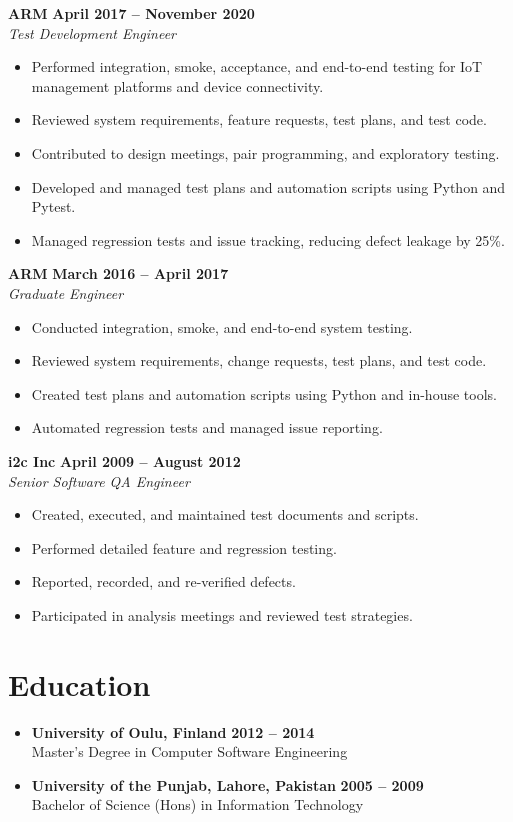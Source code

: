 \documentclass[12pt]{article}
\begin{document}
\textbf{ARM} \hfill \textbf{April 2017 – November 2020} \\
\textit{Test Development Engineer} \\
\begin{itemize}
    \item Performed integration, smoke, acceptance, and end-to-end testing for IoT management platforms and device connectivity.
    \item Reviewed system requirements, feature requests, test plans, and test code.
    \item Contributed to design meetings, pair programming, and exploratory testing.
    \item Developed and managed test plans and automation scripts using Python and Pytest.
    \item Managed regression tests and issue tracking, reducing defect leakage by 25\%.
\end{itemize}

\textbf{ARM} \hfill \textbf{March 2016 – April 2017} \\
\textit{Graduate Engineer} \\
\begin{itemize}
    \item Conducted integration, smoke, and end-to-end system testing.
    \item Reviewed system requirements, change requests, test plans, and test code.
    \item Created test plans and automation scripts using Python and in-house tools.
    \item Automated regression tests and managed issue reporting.
\end{itemize}

\textbf{i2c Inc} \hfill \textbf{April 2009 – August 2012} \\
\textit{Senior Software QA Engineer} \\
\begin{itemize}
    \item Created, executed, and maintained test documents and scripts.
    \item Performed detailed feature and regression testing.
    \item Reported, recorded, and re-verified defects.
    \item Participated in analysis meetings and reviewed test strategies.
\end{itemize}

\section*{Education}\label{education}
\begin{itemize}[leftmargin=1.5em]
    \item \textbf{University of Oulu, Finland} \hfill \textbf{2012 – 2014} \\
    Master's Degree in Computer Software Engineering

    \item \textbf{University of the Punjab, Lahore, Pakistan} \hfill \textbf{2005 – 2009} \\
 Bachelor of Science (Hons) in Information Technology
\end{itemize}
\end{document}
